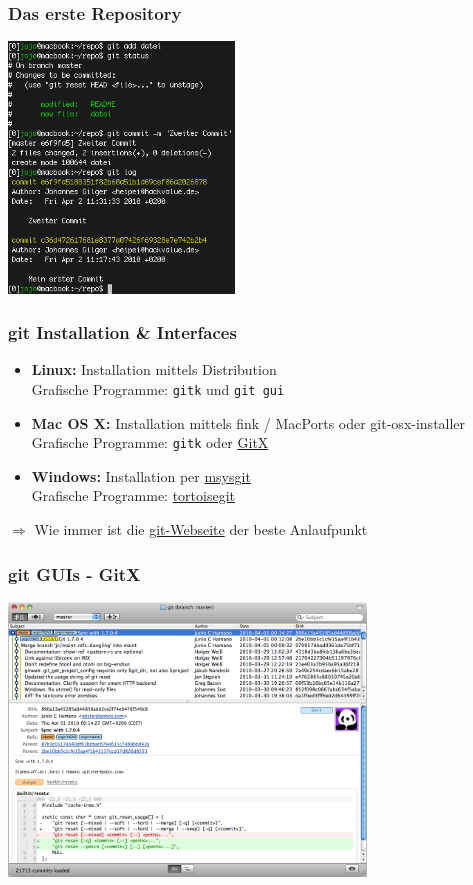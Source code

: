 \begin{frame}
  \frametitle{Das erste Repository}
  \vspace{-0.3cm}
  \begin{center}
    \includegraphics[width=6cm]{img/tutorial_3.png}
  \end{center}
\end{frame}

\begin{frame}
  \frametitle{git Installation \& Interfaces}
  \begin{itemize}
    \item {\bf Linux:} Installation mittels Distribution \\ Grafische Programme: {\tt gitk} und {\tt git gui}
    \item {\bf Mac OS X:} Installation mittels fink / MacPorts oder git-osx-installer \\ Grafische Programme: {\tt gitk} oder \href{http://gitx.frim.nl/}{GitX}
    \item {\bf Windows:} Installation per \href{http://code.google.com/p/msysgit/}{msysgit} \\ Grafische Programme: \href{http://code.google.com/p/tortoisegit/}{tortoisegit}
  \end{itemize}
  $\Rightarrow$ Wie immer ist die \href{http://git-scm.com}{git-Webseite} der beste Anlaufpunkt

\end{frame}

\begin{frame}
  \frametitle{git GUIs - GitX}
  \vspace{-0.3cm}
  \begin{center}
    \includegraphics[width=9.5cm]{img/gitx.png}
  \end{center}
\end{frame}

